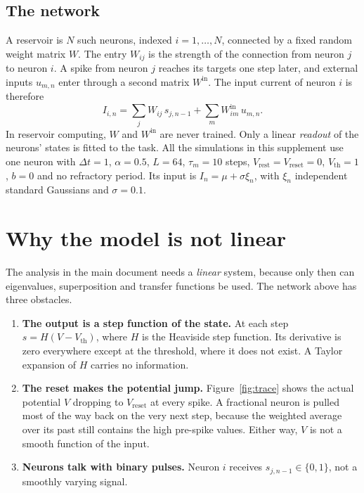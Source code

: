 \documentclass[11pt,a4paper]{article}
\newcommand{\Vth}{V_{\mathrm{th}}}
\newcommand{\Vrest}{V_{\mathrm{rest}}}
\newcommand{\Vreset}{V_{\mathrm{reset}}}
\begin{document}
\subsection{The network}

A reservoir is $N$ such neurons, indexed $i = 1, \dots, N$, connected by a fixed random weight matrix $W$. The entry $W_{ij}$ is the strength of the connection from neuron $j$ to neuron $i$. A spike from neuron $j$ reaches its targets one step later, and external inputs $u_{m,n}$ enter through a second matrix $W^{\mathrm{in}}$. The input current of neuron $i$ is therefore
\begin{equation}
I_{i,n} = \sum_j W_{ij}\, s_{j,n-1} + \sum_m W^{\mathrm{in}}_{im}\, u_{m,n}.
\label{eq:input}
\end{equation}
In reservoir computing, $W$ and $W^{\mathrm{in}}$ are never trained. Only a linear \emph{readout} of the neurons' states is fitted to the task. All the simulations in this supplement use one neuron with $\Delta t = 1$, $\alpha = 0.5$, $L = 64$, $\tau_m = 10$ steps, $\Vrest = \Vreset = 0$, $\Vth = 1$, $b = 0$ and no refractory period. Its input is $I_n = \mu + \sigma \xi_n$, with $\xi_n$ independent standard Gaussians and $\sigma = 0.1$.

\section{Why the model is not linear}
\label{sec:obstacles}

The analysis in the main document needs a \emph{linear} system, because only then can eigenvalues, superposition and transfer functions be used. The network above has three obstacles.

\begin{enumerate}
  \item \textbf{The output is a step function of the state.} At each step $s = H(V - \Vth)$, where $H$ is the Heaviside step function. Its derivative is zero everywhere except at the threshold, where it does not exist. A Taylor expansion of $H$ carries no information.
  \item \textbf{The reset makes the potential jump.} Figure~\ref{fig:trace} shows the actual potential $V$ dropping to $\Vreset$ at every spike. A fractional neuron is pulled most of the way back on the very next step, because the weighted average over its past still contains the high pre-spike values. Either way, $V$ is not a smooth function of the input.
  \item \textbf{Neurons talk with binary pulses.} Neuron $i$ receives $s_{j,n-1} \in \{0,1\}$, not a smoothly varying signal.
\end{enumerate}
\end{document}

